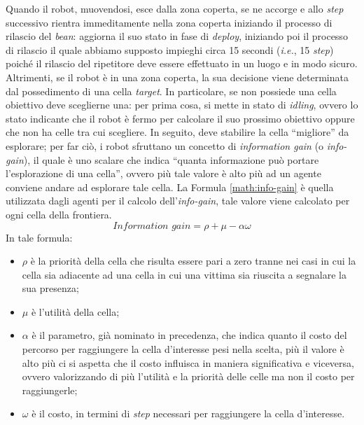 Quando il robot, muovendosi, esce dalla zona coperta, se ne accorge e allo \textit{step} successivo rientra immeditamente nella zona coperta iniziando il processo di rilascio del \textit{bean}: aggiorna il suo stato in fase di \textit{deploy}, iniziando poi il processo di rilascio il quale abbiamo supposto impieghi circa 15 secondi (\textit{i.e.}, 15 \textit{step}) poiché il rilascio del ripetitore deve essere effettuato in un luogo e in modo sicuro.\\
Altrimenti, se il robot è in una zona coperta, la sua decisione viene determinata dal possedimento di una cella \textit{target}.
In particolare, se non possiede una cella obiettivo deve sceglierne una: per prima cosa, si mette in stato di \textit{idling}, ovvero lo stato indicante che il robot è fermo per calcolare il suo prossimo obiettivo oppure che non ha celle tra cui scegliere.
In seguito, deve stabilire la cella “migliore” da esplorare; per far ciò, i robot sfruttano un concetto di \textit{information gain} (o \textit{info-gain}),  il quale è uno scalare che indica “quanta informazione può portare l'esplorazione di una cella”, ovvero più tale valore è alto più ad un agente conviene andare ad esplorare tale cella.
La Formula \ref{math:info-gain} è quella utilizzata dagli agenti per il calcolo dell'\textit{info-gain}, tale valore viene calcolato per ogni cella della frontiera.
\begin{equation}
	\label{math:info-gain}
	\textit{Information gain} = \rho+\mu-\alpha\omega
\end{equation}
In tale formula:
\begin{itemize}
	\item $\rho$ è la priorità della cella che risulta essere pari a zero tranne nei casi in cui la cella sia adiacente ad una cella in cui una vittima sia riuscita a segnalare la sua presenza;
	\item $\mu$ è l'utilità della cella;
	\item $\alpha$ è il parametro, già nominato in precedenza, che indica quanto il costo del percorso per raggiungere la cella d'interesse pesi nella scelta, più il valore è alto più ci si aspetta che il costo influisca in maniera significativa e viceversa, ovvero valorizzando di più l'utilità e la priorità delle celle ma non il costo per raggiungerle;
	\item $\omega$ è il costo, in termini di \textit{step} necessari per raggiungere la cella d'interesse. 
\end{itemize}
